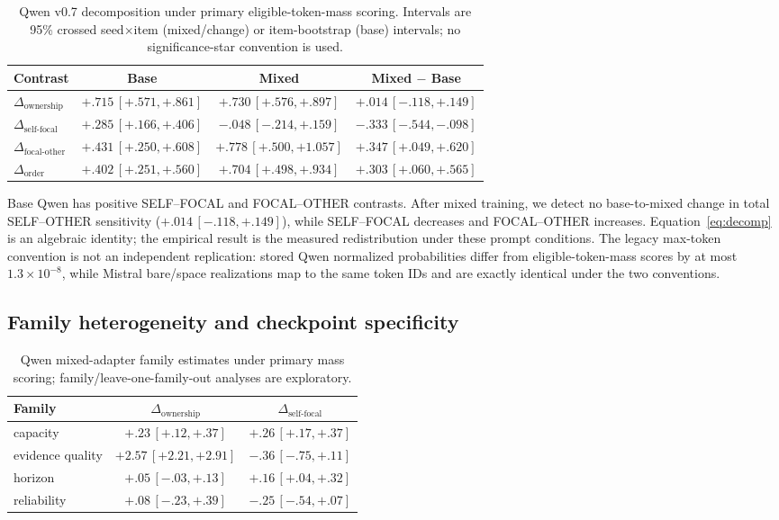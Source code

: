 \documentclass{article}
\begin{document}
\begin{table}[t]
\caption{Qwen v0.7 decomposition under primary eligible-token-mass scoring. Intervals are 95\% crossed seed$\times$item (mixed/change) or item-bootstrap (base) intervals; no significance-star convention is used.}
\label{tab:decomposition}
\scriptsize
\begin{center}
\begin{tabular}{lccc}
\toprule
Contrast & Base & Mixed & Mixed $-$ Base \\
\midrule
$\Delta_{\mathrm{ownership}}$ & $+.715\,[+.571,+.861]$ & $+.730\,[+.576,+.897]$ & $+.014\,[-.118,+.149]$ \\
$\Delta_{\mathrm{self\text{-}focal}}$ & $+.285\,[+.166,+.406]$ & $-.048\,[-.214,+.159]$ & $-.333\,[-.544,-.098]$ \\
$\Delta_{\mathrm{focal\text{-}other}}$ & $+.431\,[+.250,+.608]$ & $+.778\,[+.500,+1.057]$ & $+.347\,[+.049,+.620]$ \\
$\Delta_{\mathrm{order}}$ & $+.402\,[+.251,+.560]$ & $+.704\,[+.498,+.934]$ & $+.303\,[+.060,+.565]$ \\
\bottomrule
\end{tabular}
\end{center}
\end{table}

Base Qwen has positive SELF--FOCAL and FOCAL--OTHER contrasts. After mixed training, we detect no base-to-mixed change in total SELF--OTHER sensitivity ($+.014\,[-.118,+.149]$), while SELF--FOCAL decreases and FOCAL--OTHER increases. Equation~\ref{eq:decomp} is an algebraic identity; the empirical result is the measured redistribution under these prompt conditions. The legacy max-token convention is not an independent replication: stored Qwen normalized probabilities differ from eligible-token-mass scores by at most $1.3\times10^{-8}$, while Mistral bare/space realizations map to the same token IDs and are exactly identical under the two conventions.

\subsection{Family heterogeneity and checkpoint specificity}

\begin{table}[t]
\caption{Qwen mixed-adapter family estimates under primary mass scoring; family/leave-one-family-out analyses are exploratory.}
\label{tab:families}
\scriptsize
\begin{center}
\begin{tabular}{lcc}
\toprule
Family & $\Delta_{\mathrm{ownership}}$ & $\Delta_{\mathrm{self\text{-}focal}}$ \\
\midrule
capacity & $+.23\,[+.12,+.37]$ & $+.26\,[+.17,+.37]$ \\
evidence quality & $+2.57\,[+2.21,+2.91]$ & $-.36\,[-.75,+.11]$ \\
horizon & $+.05\,[-.03,+.13]$ & $+.16\,[+.04,+.32]$ \\
reliability & $+.08\,[-.23,+.39]$ & $-.25\,[-.54,+.07]$ \\
\bottomrule
\end{tabular}
\end{center}
\end{table}
\end{document}
